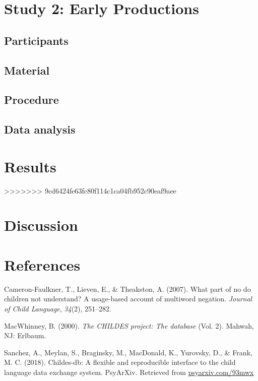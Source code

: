 \documentclass[man,floatsintext,draftall]{apa6}
\begin{document}
\hypertarget{study-2-early-productions}{%
\section{Study 2: Early Productions}\label{study-2-early-productions}}

\hypertarget{participants}{%
\subsection{Participants}\label{participants}}

\hypertarget{material}{%
\subsection{Material}\label{material}}

\hypertarget{procedure-1}{%
\subsection{Procedure}\label{procedure-1}}

\hypertarget{data-analysis}{%
\subsection{Data analysis}\label{data-analysis}}

\hypertarget{results-1}{%
\section{Results}\label{results-1}}
>>>>>>> 9cd6424fe63fc80f114c1ca04fb952c90eaf9aee

\hypertarget{discussion}{%
\section{Discussion}\label{discussion}}

\newpage

\hypertarget{references}{%
\section{References}\label{references}}

\begingroup
\setlength{\parindent}{-0.5in}
\setlength{\leftskip}{0.5in}

\endgroup

\hypertarget{refs}{}
\leavevmode\hypertarget{ref-cameron2007part}{}%
Cameron-Faulkner, T., Lieven, E., \& Theakston, A. (2007). What part of no do children not understand? A usage-based account of multiword negation. \emph{Journal of Child Language}, \emph{34}(2), 251--282.

\leavevmode\hypertarget{ref-macwhinney2000childes}{}%
MacWhinney, B. (2000). \emph{The CHILDES project: The database} (Vol. 2). Mahwah, NJ: Erlbaum.

\leavevmode\hypertarget{ref-sanchez2018childes}{}%
Sanchez, A., Meylan, S., Braginsky, M., MacDonald, K., Yurovsky, D., \& Frank, M. C. (2018). Childes-db: A flexible and reproducible interface to the child language data exchange system. PsyArXiv. Retrieved from \url{psyarxiv.com/93mwx}
\end{document}
